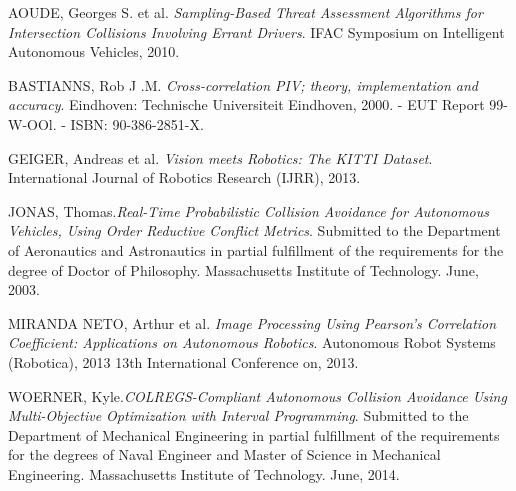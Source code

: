 \documentclass[a4paper,10pt]{article}
\begin{document}
\begin{thebibliography}{10}
         AOUDE, Georges S. et al. \textsl{Sampling-Based Threat Assessment Algorithms for Intersection Collisions Involving 
        Errant Drivers}. IFAC Symposium on Intelligent Autonomous Vehicles, 2010.
        
	 BASTIANNS, Rob J .M. \textsl{Cross-correlation PIV; theory, implementation and accuracy}. 
        Eindhoven: Technische Universiteit Eindhoven, 2000. - EUT Report 99-W-OOl. - ISBN: 90-386-2851-X.
        
         GEIGER, Andreas et al.
        \textsl{Vision meets Robotics: The KITTI Dataset}. International Journal of Robotics Research (IJRR), 2013.
        
         JONAS, Thomas.\textsl{Real-Time Probabilistic Collision Avoidance for Autonomous Vehicles, Using Order Reductive 
        Conflict Metrics}. Submitted to the Department of Aeronautics and Astronautics
	in partial fulfillment of the requirements for the degree of Doctor of Philosophy. Massachusetts Institute of Technology. June, 2003.
        
         MIRANDA NETO, Arthur et al. \textsl{Image Processing Using Pearson’s Correlation Coefficient: 
        Applications on Autonomous Robotics}. 
        Autonomous Robot Systems (Robotica), 2013 13th International Conference on, 2013.
	
	 WOERNER, Kyle.\textsl{COLREGS-Compliant Autonomous Collision Avoidance Using Multi-Objective Optimization
	with Interval Programming}. Submitted to the Department of Mechanical Engineering in partial fulfillment of the requirements for the 
	degrees of Naval Engineer and Master of Science in Mechanical Engineering. Massachusetts Institute of Technology. June, 2014.
	
\end{thebibliography}
\end{document}

